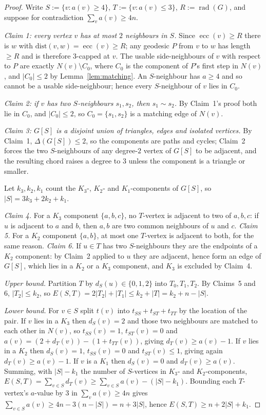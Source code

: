 \documentclass[11pt]{article}
\theoremstyle{plain}
\theoremstyle{definition}
\theoremstyle{remark}
\numberwithin{equation}{section}
\newcommand{\rad}{\operatorname{rad}}
\newcommand{\ecc}{\operatorname{ecc}}
\begin{document}
\begin{proof}
Write $S := \{v : a(v)\ge 4\}$, $T := \{v : a(v)\le 3\}$, $R := \rad(G)$, and suppose for
contradiction $\sum_v a(v) \ge 4n$.

\emph{Claim 1: every vertex $v$ has at most $2$ neighbours in $S$.} Since $\ecc(v)\ge R$
there is $w$ with $\mathrm{dist}(v,w) = \ecc(v)\ge R$; any geodesic $P$ from $v$ to $w$ has
length $\ge R$ and is therefore $3$-capped at $v$. The usable side-neighbours of $v$ with
respect to $P$ are exactly $N(v)\setminus C_0$, where $C_0$ is the component of $P$'s first
step in $N(v)$, and $|C_0|\le 2$ by Lemma~\ref{lem:matching}. An $S$-neighbour has $a \ge 4$
and so cannot be a usable side-neighbour; hence every $S$-neighbour of $v$ lies in $C_0$.

\emph{Claim 2: if $v$ has two $S$-neighbours $s_1,s_2$, then $s_1\sim s_2$.} By Claim~1's
proof both lie in $C_0$, and $|C_0|\le 2$, so $C_0 = \{s_1,s_2\}$ is a matching edge of
$N(v)$.

\emph{Claim 3: $G[S]$ is a disjoint union of triangles, edges and isolated vertices.} By
Claim~1, $\Delta(G[S])\le 2$, so the components are paths and cycles; Claim~2 forces the two
$S$-neighbours of any degree-$2$ vertex of $G[S]$ to be adjacent, and the resulting chord
raises a degree to $3$ unless the component is a triangle or smaller.

Let $k_3,k_2,k_1$ count the $K_3$-, $K_2$- and $K_1$-components of $G[S]$, so
$|S| = 3k_3+2k_2+k_1$.

\emph{Claim 4.} For a $K_3$ component $\{a,b,c\}$, no $T$-vertex is adjacent to two of
$a,b,c$: if $u$ is adjacent to $a$ and $b$, then $a,b$ are two common neighbours of $u$ and
$c$. \emph{Claim 5.} For a $K_2$ component $\{a,b\}$, at most one $T$-vertex is adjacent to
both, for the same reason. \emph{Claim 6.} If $u \in T$ has two $S$-neighbours they are the
endpoints of a $K_2$ component: by Claim~2 applied to $u$ they are adjacent, hence form an
edge of $G[S]$, which lies in a $K_2$ or a $K_3$ component, and $K_3$ is excluded by
Claim~4.

\emph{Upper bound.} Partition $T$ by $d_S(u)\in\{0,1,2\}$ into $T_0,T_1,T_2$. By Claims~5
and 6, $|T_2|\le k_2$, so
$E(S,T) = 2|T_2|+|T_1| \le k_2 + |T| = k_2 + n - |S|$.

\emph{Lower bound.} For $v \in S$ split $t(v)$ into $t_{SS}+t_{ST}+t_{TT}$ by the location of
the pair. If $v$ lies in a $K_3$ then $d_S(v) = 2$ and those two neighbours are matched to
each other in $N(v)$, so $t_{SS}(v) = 1$, $t_{ST}(v) = 0$ and
$a(v) = (2+d_T(v)) - (1+t_{TT}(v))$, giving $d_T(v)\ge a(v)-1$. If $v$ lies in a $K_2$ then
$d_S(v) = 1$, $t_{SS}(v) = 0$ and $t_{ST}(v)\le 1$, giving again $d_T(v)\ge a(v)-1$. If $v$
is a $K_1$ then $d_S(v) = 0$ and $d_T(v)\ge a(v)$. Summing, with $|S| - k_1$ the number of
$S$-vertices in $K_3$- and $K_2$-components,
$E(S,T) = \sum_{v\in S} d_T(v) \ge \sum_{v\in S}a(v) - (|S|-k_1)$. Bounding each $T$-vertex's
$a$-value by $3$ in $\sum_v a(v)\ge 4n$ gives $\sum_{v\in S}a(v)\ge 4n - 3(n-|S|) = n+3|S|$,
hence $E(S,T)\ge n+2|S|+k_1$.


\end{proof}
\end{document}
